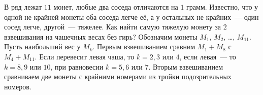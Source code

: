 \problem{}
В ряд лежат $11$ монет, любые два соседа отличаются на $1$ грамм.
Известно, что у одной не крайней монеты оба соседа легче её, а у остальных не
крайних~--- один сосед легче, другой~--- тяжелее.
Как найти самую тяжелую монету за $2$ взвешивания на чашечных весах без гирь?
\solution
Обозначим монеты $M_1$, $M_2$, \ldots, $M_{11}$.
Пусть наибольший вес у $M_k$.
Первым взвешиванием сравним $M_1 + M_8$ с $M_4 + M_{11}$.
Если перевесит левая чаша, то $k = 2, 3 \text{ или } 4$,
если левая~--- то $k = 8, 9 \text{ или } 10$,
при равновесии $k = 5, 6 \text{ или } 7$.
Вторым взвешиванием сравниваем две монеты с крайними номерами из тройки
подозрительных номеров.
\endproblem
